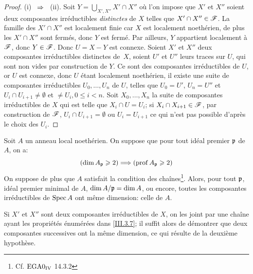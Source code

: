 \begin{proof}
(i) ~$\To$~ (ii). Soit $Y=\bigcup_{X', X''} X'\cap X''$ o\`u l'on impose que $X'$ et $X''$ soient deux composantes irr\'eductibles \emph{distinctes} de $X$ telles que $X'\cap X'' \in {\mathscr F}$. La famille des $X'\cap X''$ est localement finie car $X$ est localement noeth\'erien, de plus les $X'\cap X''$ sont ferm\'es, donc $Y$ est ferm\'e. Par ailleurs, $Y$ appartient localement \`a ${\mathscr F}$, donc $Y\in {\mathscr F}$. Donc $U=X-Y$ est connexe. Soient $X'$ et $X''$ deux composantes irr\'eductibles distinctes de~$X$, soient $U'$ et $U''$ leurs traces sur $U$, qui sont non vides par construction de $Y$. Ce sont des composantes irr\'eductibles de $U$, or $U$ est connexe, donc $U$ \'etant localement noeth\'erien, il existe une suite de composantes irr\'eductibles $U_0, \ldots, U_n$ de $U$, telles que $U_0=U'$, $U_n=U''$ et $U_{i}\cap U_{i+1}\neq \emptyset$ et $\neq U_{i}, 0\leq i < n$. Soit $X_0, \ldots, X_n$ la suite de composantes irr\'eductibles de $X$ qui est telle que $X_{i}\cap U=U_{i}$; si $X_{i}\cap X_{i+1}\in {\mathscr F}$, par construction de ${\mathscr F}$, $U_{i}\cap U_{i+1}=\emptyset$ ou $U_{i}=U_{i+1}$ ce qui n'est pas possible d'apr\`es le choix des $U_{i}$.
\end{proof}

\begin{corollaire} \label{III.3.9}
Soit $A$ un anneau local noeth\'erien. On suppose que pour tout id\'eal premier $\mathfrak{p}$ de $A$, on a:
\[
(\dim A_\pp \geq 2) \To (\prof A_\pp \geq 2)
\]
On suppose de plus que $A$ satisfait la condition des cha\^ines\footnote{Cf. $\textup{EGA}\space 0_{\textup{IV}}$ 14.3.2}. Alors, pour tout $\mathfrak{p}$, id\'eal premier minimal de $A$, $\dim A/\mathfrak{p} =\dim A$, ou encore, toutes les composantes irr\'eductibles de $\operatorname{Spec} A$ ont m\^eme dimension: celle de $A$.
\end{corollaire}

Si $X'$ et $X''$ sont deux composantes irr\'eductibles de $X$, on les joint par une cha\^ine ayant les propri\'et\'es \'enum\'er\'ees dans \ignorespaces \ref{III.3.7}; il suffit alors de d\'emontrer que deux composantes successives ont la m\^eme dimension, ce qui r\'esulte de la deuxi\`eme hypoth\`ese.

